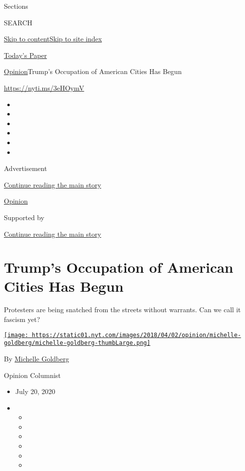 Sections

SEARCH

\protect\hyperlink{site-content}{Skip to
content}\protect\hyperlink{site-index}{Skip to site index}

\href{https://myaccount.nytimes.com/auth/login?response_type=cookie\&client_id=vi}{}

\href{https://www.nytimes.com/section/todayspaper}{Today's Paper}

\href{/section/opinion}{Opinion}\textbar{}Trump's Occupation of American
Cities Has Begun

\href{https://nyti.ms/3eHOymV}{https://nyti.ms/3eHOymV}

\begin{itemize}
\item
\item
\item
\item
\item
\item
\end{itemize}

Advertisement

\protect\hyperlink{after-top}{Continue reading the main story}

\href{/section/opinion}{Opinion}

Supported by

\protect\hyperlink{after-sponsor}{Continue reading the main story}

\hypertarget{trumps-occupation-of-american-cities-has-begun}{%
\section{Trump's Occupation of American Cities Has
Begun}\label{trumps-occupation-of-american-cities-has-begun}}

Protesters are being snatched from the streets without warrants. Can we
call it fascism yet?

\href{https://www.nytimes.com/by/michelle-goldberg}{\texttt{[image: https://static01.nyt.com/images/2018/04/02/opinion/michelle-goldberg/michelle-goldberg-thumbLarge.png]}}

By \href{https://www.nytimes.com/by/michelle-goldberg}{Michelle
Goldberg}

Opinion Columnist

\begin{itemize}
\item
  July 20, 2020
\item
  \begin{itemize}
  \item
  \item
  \item
  \item
  \item
  \item
  \end{itemize}
\end{itemize}

